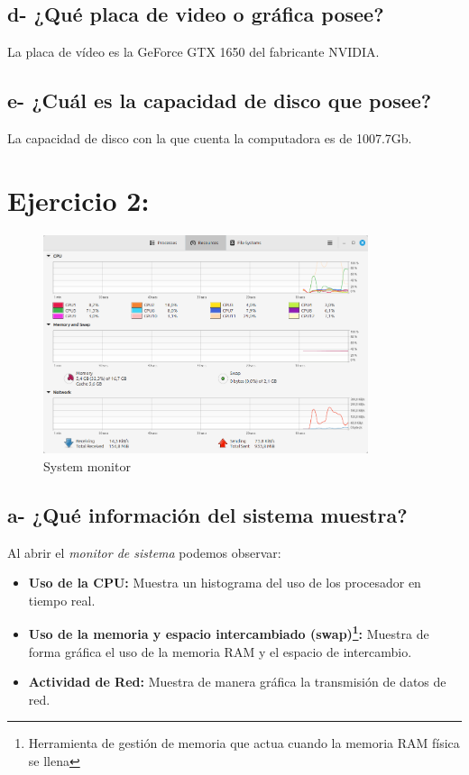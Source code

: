 \documentclass{article}
\begin{document}
\subsection*{d- ¿Qué placa de video o gráfica posee?}
\noindent
La placa de vídeo es la GeForce GTX 1650 del fabricante NVIDIA.\@

\subsection*{e- ¿Cuál es la capacidad de disco que posee?}
\noindent
La capacidad de disco con la que cuenta la computadora es de 1007.7Gb.


\section*{Ejercicio 2:}

\begin{figure}[h]
  \centering
  \includegraphics[width=0.85\textwidth]{resources/2.png}
  \caption{System monitor}
\end{figure}

\subsection*{a- ¿Qué información del sistema muestra?}

\noindent
Al abrir el \textit{monitor de sistema} podemos observar:

\begin{itemize}
    \item \textbf{Uso de la CPU:\@} Muestra un histograma del uso de los procesador en tiempo real.
    \item \textbf{Uso de la memoria y espacio intercambiado (swap)\footnote{Herramienta de gestión de memoria que actua cuando la memoria RAM física se llena}: }
    Muestra de forma gráfica el uso de la memoria RAM y el espacio de intercambio.
    \item \textbf{Actividad de Red: } Muestra de manera gráfica la transmisión de  datos de red.
\end{itemize}
\end{document}
